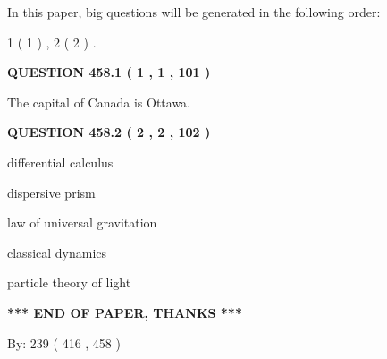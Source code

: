 \documentclass[12pt]{article}
\begin{document}
   
   
   
   
\vspace{0.2in}
   
In this paper, big questions will be generated in the following order: 
   
   
   1 ( 1 )
 ,
   2 ( 2 )
 .
  
\vspace{0.2in}
  
{\textbf{\Large{QUESTION
458.1 
 ( 1 , 1 , 101 )
}}}
  
  
 
 
\noindent{}
 
 
The capital of Canada is Ottawa.
 
 
 
 
  
\vspace{0.2in}
  
{\textbf{\Large{QUESTION
458.2 
 ( 2 , 2 , 102 )
}}}
  
  
 
 
\noindent{}
 
 
differential calculus
 
 
dispersive prism
 
 
law of universal gravitation
 
 
classical dynamics
 
 
particle theory of light
 
 
 
 
   
   
\vspace{1.0in} 
{\textbf{\large{ *** END OF PAPER, THANKS *** }}} 
   
   
\hspace{1.0in} By: 
 239 ( 416 ,  458 )
   
   
   
\vspace{0.2in}
\vspace{0.2in}
   
   
 \newpage
\setcounter{page}{1} 
   
\end{document}
